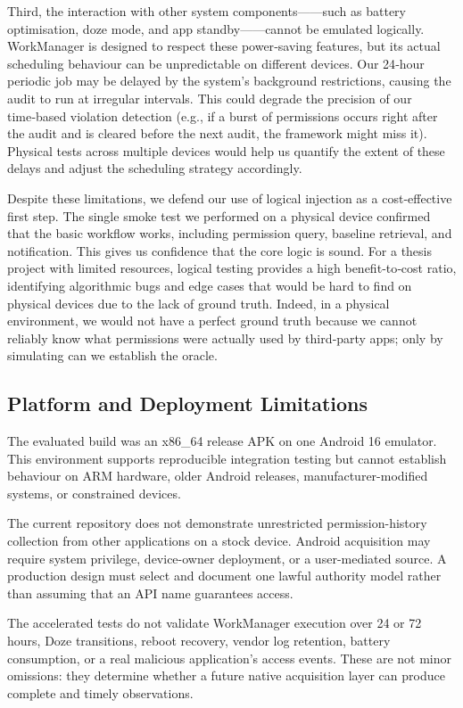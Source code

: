 Third, the interaction with other system components——such as battery optimisation, doze mode, and app standby——cannot be emulated logically. WorkManager is designed to respect these power‑saving features, but its actual scheduling behaviour can be unpredictable on different devices. Our 24‑hour periodic job may be delayed by the system's background restrictions, causing the audit to run at irregular intervals. This could degrade the precision of our time‑based violation detection (e.g., if a burst of permissions occurs right after the audit and is cleared before the next audit, the framework might miss it). Physical tests across multiple devices would help us quantify the extent of these delays and adjust the scheduling strategy accordingly.

Despite these limitations, we defend our use of logical injection as a cost‑effective first step. The single smoke test we performed on a physical device confirmed that the basic workflow works, including permission query, baseline retrieval, and notification. This gives us confidence that the core logic is sound. For a thesis project with limited resources, logical testing provides a high benefit‑to‑cost ratio, identifying algorithmic bugs and edge cases that would be hard to find on physical devices due to the lack of ground truth. Indeed, in a physical environment, we would not have a perfect ground truth because we cannot reliably know what permissions were actually used by third‑party apps; only by simulating can we establish the oracle.

\subsection{Platform and Deployment Limitations}

The evaluated build was an x86\_64 release APK on one Android 16 emulator. This environment supports reproducible integration testing but cannot establish behaviour on ARM hardware, older Android releases, manufacturer-modified systems, or constrained devices.

The current repository does not demonstrate unrestricted permission-history collection from other applications on a stock device. Android acquisition may require system privilege, device-owner deployment, or a user-mediated source. A production design must select and document one lawful authority model rather than assuming that an API name guarantees access.

The accelerated tests do not validate WorkManager execution over 24 or 72 hours, Doze transitions, reboot recovery, vendor log retention, battery consumption, or a real malicious application's access events. These are not minor omissions: they determine whether a future native acquisition layer can produce complete and timely observations.

